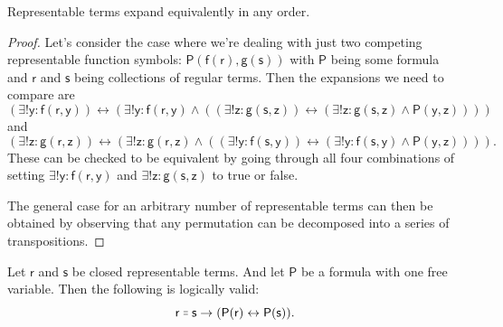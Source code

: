 \documentclass{article}
\theoremstyle{customstyle}
\newenvironment{prf}{\begin{mdframed}[skipabove=5pt, backgroundcolor=Gray!10, topline=false, bottomline=false, leftline=false, rightline=false]\begin{proof}}{\end{proof}\end{mdframed}}
\newcommand{\qu}[1]{\mathsf{#1}}
\newcommand{\uq}[1]{\text{$#1$}}
\newcommand{\eq}{\mathrel{\resizebox{1.15\height}{1.15\height}{=}}}
\begin{document}
\begin{lemma}\label{lm-expd}
  Representable terms expand equivalently in any order.
\end{lemma}

\begin{prf}
  Let's consider the case where we're dealing with just two competing representable function symbols: $\qu{P(\uq{f}(\bm{\qu{r}}), \uq{g}(\bm{\qu{s}}))}$ with $\qu{P}$ being some formula and $\bm{\qu{r}}$ and $\bm{\qu{s}}$ being collections of regular terms. Then the expansions we need to compare are
  \[
    \qu{(\exists! y \colon \uq{f}(\bm{\qu{r}}, y)) \leftrightarrow (\exists! y \colon \uq{f}(\bm{\qu{r}}, y) \land ((\exists! z \colon \uq{g}(\bm{\qu{s}}, z)) \leftrightarrow (\exists! z \colon \uq{g}(\bm{\qu{s}}, z) \land P(y, z))))}\phantom{.}
  \]
  and
  \[
    \qu{(\exists! z \colon \uq{g}(\bm{\qu{r}}, z)) \leftrightarrow (\exists! z \colon \uq{g}(\bm{\qu{r}}, z) \land ((\exists! y \colon \uq{f}(\bm{\qu{s}}, y)) \leftrightarrow (\exists! y \colon \uq{f}(\bm{\qu{s}}, y) \land P(y, z))))}.
  \]
  These can be checked to be equivalent by going through all four combinations of setting $\qu{\exists! y \colon \uq{f}(\bm{\qu{r}}, y)}$ and $\qu{\exists! z \colon \uq{g}(\bm{\qu{s}}, z)}$ to true or false.

  The general case for an arbitrary number of representable terms can then be obtained by observing that any permutation can be decomposed into a series of transpositions.
\end{prf}

\begin{lemma}\label{lm-equiv}
  Let $\qu{r}$ and $\qu{s}$ be closed representable terms. And let $\qu{P}$ be a formula with one free variable. Then the following is logically valid:
  \[
    \qu{r \eq s \rightarrow (P(r) \leftrightarrow P(s))}.
  \]
\end{lemma}
\end{document}
